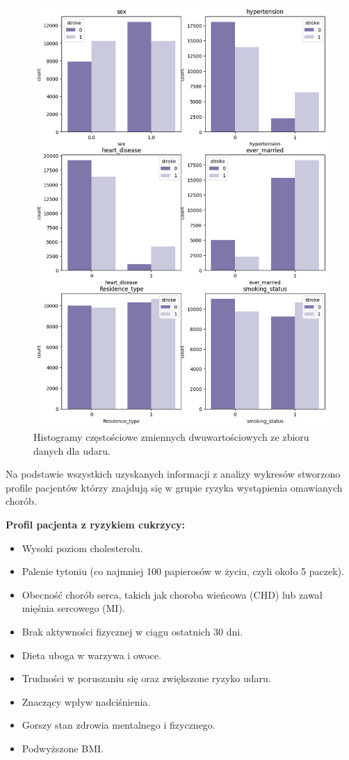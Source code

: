 \documentclass[onecolumn,12pt]{article}
\begin{document}
\begin{figure}[H]
    \centering
    \includegraphics[width=0.8\linewidth]{raport/graphs/stroke_binary.png}
    \captionsetup{justification=centering}
    \caption{Histogramy częstościowe zmiennych dwuwartościowych ze zbioru danych dla udaru.}
    \label{fig:enter-label}
\end{figure}

\newpage
\noindent
Na podstawie wszystkich uzyskanych informacji z analizy wykresów stworzono profile pacjentów którzy znajdują się w grupie ryzyka wystąpienia omawianych chorób.

\vspace{8pt}
\noindent
\textbf{Profil pacjenta z ryzykiem cukrzycy:}
\begin{itemize}
    \itemsep0em 
    \item Wysoki poziom cholesterolu.
    \item Palenie tytoniu (co najmniej 100 papierosów w życiu, czyli około 5 paczek).
    \item Obecność chorób serca, takich jak choroba wieńcowa (CHD) lub zawał mięśnia sercowego (MI).
    \item Brak aktywności fizycznej w ciągu ostatnich 30 dni.
    \item Dieta uboga w warzywa i owoce.
    \item Trudności w poruszaniu się oraz zwiększone ryzyko udaru.
    \item Znaczący wpływ nadciśnienia.
    \item Gorszy stan zdrowia mentalnego i fizycznego.
    \item Podwyższone BMI.
\end{itemize}
\end{document}
